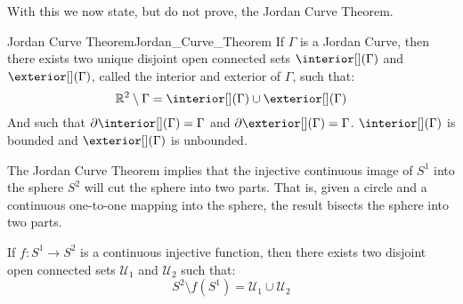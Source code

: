             With this we now state, but do not prove, the Jordan Curve Theorem.
            \begin{ftheorem}{Jordan Curve Theorem}{Jordan_Curve_Theorem}
                If $\Gamma$ is a Jordan Curve, then there exists two unique
                disjoint open connected sets $\interior[](\Gamma)$ and $\exterior[](\Gamma)$,
                called the interior and exterior of $\Gamma$, such that:
                \begin{equation}
                    \mathbb{R}^{2}\setminus\Gamma=\interior[](\Gamma)\cup\exterior[](\Gamma)
                \end{equation}
                And such that $\partial\interior[](\Gamma)=\Gamma$ and
                $\partial\exterior[](\Gamma)=\Gamma$. $\interior[](\Gamma)$ is
                bounded and $\exterior[](\Gamma)$ is unbounded.
            \end{ftheorem}
            The Jordan Curve Theorem implies that the injective continuous
            image of $S^{1}$ into the sphere $S^{2}$ will cut the
            sphere into two parts. That is, given a circle and
            a continuous one-to-one mapping into the sphere, the
            result bisects the sphere into two parts.
            \begin{theorem}
                \label{thm:Sphere_Without_Circle_Is_Disconnected}
                If $f:S^{1}\rightarrow{S}^{2}$ is a continuous injective
                function, then there exists two disjoint open connected
                sets $\mathcal{U}_{1}$ and $\mathcal{U}_{2}$ such that:
                \begin{equation}
                    S^{2}\setminus{f}(S^{1})
                    =\mathcal{U}_{1}\cup\mathcal{U}_{2}
                \end{equation}
            \end{theorem}
